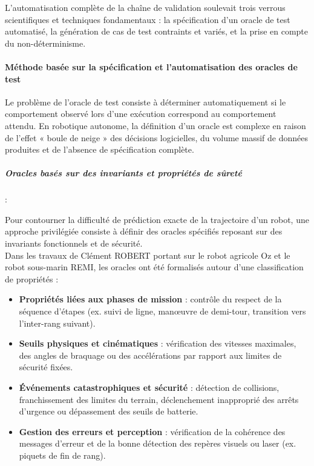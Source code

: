 L'automatisation complète de la chaîne de validation soulevait trois verrous scientifiques et techniques fondamentaux : la spécification d'un oracle de test automatisé, la génération de cas de test contraints et variés, et la prise en compte du non-déterminisme.


\paragraph{Méthode basée sur la spécification et l'automatisation des oracles de test}

Le problème de l'oracle de test consiste à déterminer automatiquement si le comportement observé lors d'une exécution correspond au comportement attendu. En robotique autonome, la définition d'un oracle est complexe en raison de l'effet « boule de neige » des décisions logicielles, du volume massif de données produites et de l'absence de spécification complète.

\subparagraph{Oracles basés sur des invariants et propriétés de sûreté}:

Pour contourner la difficulté de prédiction exacte de la trajectoire d'un robot, une approche privilégiée consiste à définir des oracles spécifiés reposant sur des invariants fonctionnels et de sécurité.\cite{2021TOU30119b}  \\

Dans les travaux de Clément ROBERT \cite{2021TOU30119a} portant sur le robot agricole Oz et le robot sous-marin REMI, les oracles ont été formalisés autour d'une classification de propriétés :  \\

\begin{itemize}
    \item \textbf{Propriétés liées aux phases de mission} : contrôle du respect de la séquence d'étapes (ex. suivi de ligne, manœuvre de demi-tour, transition vers l'inter-rang suivant).
    \item \textbf{Seuils physiques et cinématiques} : vérification des vitesses maximales, des angles de braquage ou des accélérations par rapport aux limites de sécurité fixées.
    \item \textbf{Événements catastrophiques et sécurité} : détection de collisions, franchissement des limites du terrain, déclenchement inapproprié des arrêts d'urgence ou dépassement des seuils de batterie.
    \item \textbf{Gestion des erreurs et perception} : vérification de la cohérence des messages d'erreur et de la bonne détection des repères visuels ou laser (ex. piquets de fin de rang).  \\
\end{itemize}

